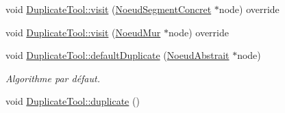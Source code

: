 \begin{DoxyCompactItemize}
\item 
void \hyperlink{group__inf2990_gaa8f5663adbfe6f00a2c2f79083339e30}{Duplicate\+Tool\+::visit} (\hyperlink{class_noeud_segment_concret}{Noeud\+Segment\+Concret} $\ast$node) override
\item 
void \hyperlink{group__inf2990_ga9b9e4456490e59603f3d8924fdf19c18}{Duplicate\+Tool\+::visit} (\hyperlink{class_noeud_mur}{Noeud\+Mur} $\ast$node) override
\item 
void \hyperlink{group__inf2990_ga4708caab32b10170d24dba25d4829677}{Duplicate\+Tool\+::default\+Duplicate} (\hyperlink{class_noeud_abstrait}{Noeud\+Abstrait} $\ast$node)
\begin{DoxyCompactList}\small\item\em Algorithme par défaut. \end{DoxyCompactList}\item 
\hypertarget{group__inf2990_gadbe76417e934ddabc6df18141162fe2c}{}void \hyperlink{group__inf2990_gadbe76417e934ddabc6df18141162fe2c}{Duplicate\+Tool\+::duplicate} ()\label{group__inf2990_gadbe76417e934ddabc6df18141162fe2c}


\end{DoxyCompactItemize}
